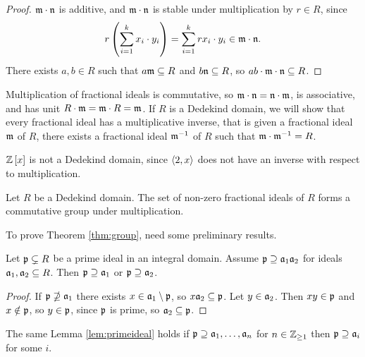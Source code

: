 \begin{proof}
$ \mm \cdot \nn $ is additive, and $ \mm \cdot \nn $ is stable under multiplication by $ r \in R $, since
$$ r\br{\sum_{i = 1}^k x_i \cdot y_i} = \sum_{i = 1}^k rx_i \cdot y_i \in \mm \cdot \nn. $$
There exists $ a, b \in R $ such that $ a\mm \subseteq R $ and $ b\nn \subseteq R $, so $ ab \cdot \mm \cdot \nn \subseteq R $.
\end{proof}

Multiplication of fractional ideals is commutative, so $ \mm \cdot \nn = \nn \cdot \mm $, is associative, and has unit $ R \cdot \mm = \mm \cdot R = \mm $. If $ R $ is a Dedekind domain, we will show that every fractional ideal has a multiplicative inverse, that is given a fractional ideal $ \mm $ of $ R $, there exists a fractional ideal $ \mm^{-1} $ of $ R $ such that $ \mm \cdot \mm^{-1} = R $.

\begin{example*}
$ \Z\sbr{x} $ is not a Dedekind domain, since $ \abr{2, x} $ does not have an inverse with respect to multiplication.
\end{example*}

\begin{theorem}
\label{thm:group}
Let $ R $ be a Dedekind domain. The set of non-zero fractional ideals of $ R $ forms a commutative group under multiplication.
\end{theorem}

To prove Theorem \ref{thm:group}, need some preliminary results.

\begin{lemma}
\label{lem:primeideal}
Let $ \pp \subsetneq R $ be a prime ideal in an integral domain. Assume $ \pp \supseteq \aa_1\aa_2 $ for ideals $ \aa_1, \aa_2 \subseteq R $. Then $ \pp \supseteq \aa_1 $ or $ \pp \supseteq \aa_2 $.
\end{lemma}

\begin{proof}
If $ \pp \nsupseteq \aa_1 $ there exists $ x \in \aa_1 \setminus \pp $, so $ x\aa_2 \subseteq \pp $. Let $ y \in \aa_2 $. Then $ xy \in \pp $ and $ x \notin \pp $, so $ y \in \pp $, since $ \pp $ is prime, so $ \aa_2 \subseteq \pp $.
\end{proof}

\begin{remark*}
The same Lemma \ref{lem:primeideal} holds if $ \pp \supseteq \aa_1, \dots, \aa_n $ for $ n \in \Z_{\ge 1} $ then $ \pp \supseteq \aa_i $ for some $ i $.
\end{remark*}


